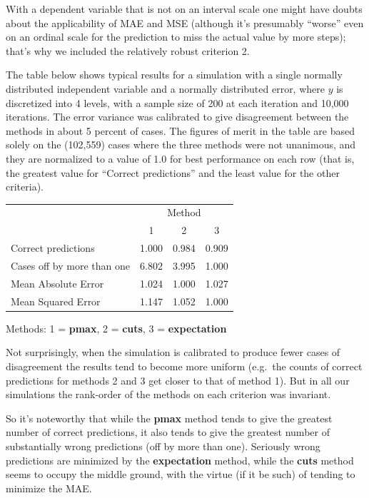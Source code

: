 \documentclass{article}
\begin{document}
With a dependent variable that is not on an interval scale one might
have doubts about the applicability of MAE and MSE (although it's
presumably ``worse'' even on an ordinal scale for the prediction to
miss the actual value by more steps); that's why we included the
relatively robust criterion 2.

The table below shows typical results for a simulation with a single
normally distributed independent variable and a normally distributed
error, where $y$ is discretized into 4 levels, with a sample size of
200 at each iteration and 10,000 iterations. The error variance was
calibrated to give disagreement between the methods in about 5 percent
of cases. The figures of merit in the table are based solely on the
(102,559) cases where the three methods were not unanimous, and they
are normalized to a value of 1.0 for best performance on each row
(that is, the greatest value for ``Correct predictions'' and the least
value for the other criteria).

\begin{center}
  \begin{tabular}{lrrr}
    & \multicolumn{3}{c}{Method} \\
    & \multicolumn{1}{c}{1} & \multicolumn{1}{c}{2} &
      \multicolumn{1}{c}{3} \\
    Correct predictions & 1.000 & 0.984 & 0.909 \\
    Cases off by more than one & 6.802 & 3.995 & 1.000 \\
    Mean Absolute Error & 1.024 & 1.000 & 1.027 \\
    Mean Squared Error & 1.147 & 1.052 & 1.000
  \end{tabular}

  {\small Methods: 1 = \textbf{pmax}, 2 = \textbf{cuts}, 3 =
  \textbf{expectation}}
\end{center}

Not surprisingly, when the simulation is calibrated to produce fewer
cases of disagreement the results tend to become more uniform (e.g.\
the counts of correct predictions for methods 2 and 3 get closer to
that of method 1). But in all our simulations the rank-order of the
methods on each criterion was invariant.

So it's noteworthy that while the \textbf{pmax} method tends to give
the greatest number of correct predictions, it also tends to give the
greatest number of substantially wrong predictions (off by more than
one). Seriously wrong predictions are minimized by the
\textbf{expectation} method, while the \textbf{cuts} method seems to
occupy the middle ground, with the virtue (if it be such) of tending
to minimize the MAE.
\end{document}
